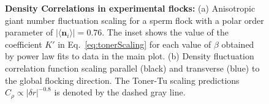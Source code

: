 \documentclass[reprint,unsortedaddress,amsmath,amssymb,aps,pre]{revtex4-2}
\begin{document}
\begin{figure}[h]
        \caption{\label{fig::SpatialStructure}
        \textbf{Density Correlations in experimental flocks:}
        (a) Anisotropic giant number fluctuation scaling for a sperm flock with a polar order parameter of $|\langle\mathbf{n}_{i}\rangle|=0.76$. The inset shows the value of the coefficient $K'$ in Eq.~\ref{eq:tonerScaling} for each value of $\beta$ obtained by power law fits to data in the main plot. (b) Density fluctuation correlation function scaling parallel (black) and transverse (blue) to the global flocking direction. The Toner-Tu scaling predictions $C_{\rho}\propto|\delta{r}|^{-0.8}$ is denoted by the dashed gray line.
       }
\end{figure}
\end{document}
